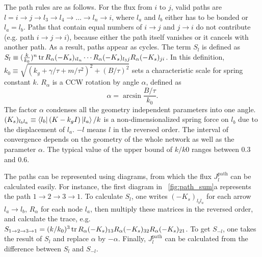 \documentclass[
 preprint,
 preprintnumbers,
 amsmath,amssymb,
 aps,
 pre,
 longbibliography,
 superscriptaddress,
 10pt, twocolumn
]{revtex4-1}
\begin{document}
The path rules are as follows.
For the flux from $i$ to $j$, valid paths are $l=i\rightarrow j\rightarrow l_3\rightarrow l_4\rightarrow \dots \rightarrow l_n\rightarrow i$, where $l_a$ and $l_b$ either has to be bonded or $l_a=l_b$. Paths that contain equal numbers of $i\rightarrow j$ and $j\rightarrow i$ do not contribute (e.g. path $i\rightarrow j\rightarrow i$), because either the path itself vanishes or it cancels with another path. As a result, paths appear as cycles.
The term $S_l$ is defined as $S_l \equiv (\frac{k}{k_0})^n \tr R_\alpha (-K_s)_{i l_n} \cdots R_\alpha (-K_s)_{l_3j} R_\alpha (-K_s)_{ji}$.
In this definition, $k_0\equiv \sqrt{(k_g+\gamma/\tau+m/\tau^2)^2 + (B/\tau)^2}$ sets a characteristic scale for spring constant $k$. $R_\alpha$ is a CCW rotation by angle $\alpha$, defined as
\begin{equation} \label{eqn:path_alpha_def}
    \alpha = \arcsin{\frac{B/\tau}{k_0}}.
\end{equation}
The factor $\alpha$ condenses all the geometry independent parameters into one angle.
$(K_s)_{l_b l_a} \equiv \bra{l_b}(K-k_gI)\ket{l_a} / k$ is a non-dimensionalized spring force on $l_b$ due to the displacement of $l_a$.
$-l$ means $l$ in the reversed order.
The interval of convergence depends on the geometry of the whole network as well as the parameter $\alpha$. The typical value of the upper bound of $k/k0$ ranges between $0.3$ and $0.6$.

The paths can be represented using diagrams, from which the flux $J^\text{path}_l$ can be calculated easily. For instance, the first diagram in \figurename~\ref{fig:path_sum}a represents the path $1\rightarrow 2\rightarrow 3\rightarrow 1$. To calculate $S_l$, one writes $(-K_s)_{l_bl_a}$ for each arrow $l_a\rightarrow l_b$, $R_\alpha$ for each node $l_a$, then multiply these matrices in the reversed order, and calculate the trace, e.g. $S_{1\rightarrow 2\rightarrow 3\rightarrow 1} = (k/k_0)^3 \tr R_\alpha (-K_s)_{13} R_\alpha (-K_s)_{32} R_\alpha (-K_s)_{21}$. To get $S_{-l}$, one takes the result of $S_l$ and replace $\alpha$ by $-\alpha$. Finally, $J^\text{path}_l$ can be calculated from the difference between $S_l$ and $S_{-l}$.
\end{document}
